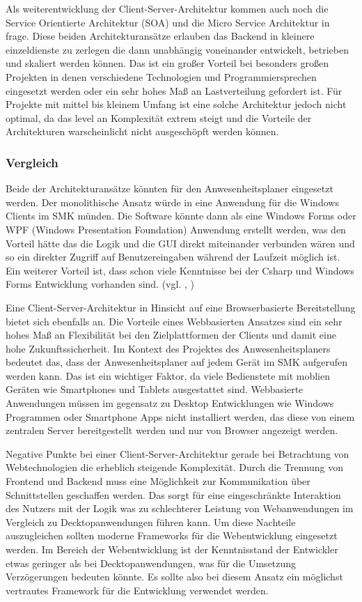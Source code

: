 Als weiterentwicklung der Client-Server-Architektur kommen auch noch die Service Orientierte Architektur (SOA) und die Micro Service Architektur in frage. Diese beiden Architekturansätze erlauben das Backend in kleinere einzeldienste zu zerlegen die dann unabhängig voneinander entwickelt, betrieben und skaliert werden können. Das ist ein großer Vorteil bei besonders großen Projekten in denen verschiedene Technologien und Programmiersprechen eingesetzt werden oder ein sehr hohes Maß an Lastverteilung gefordert ist. Für Projekte mit mittel bis kleinem Umfang ist eine solche Architektur jedoch nicht optimal, da das level an Komplexität extrem steigt und die Vorteile der Architekturen warscheinlicht nicht ausgeschöpft werden können.

\subsubsection{Vergleich}
\label{sec:Vergleich}
Beide der Architekturansätze könnten für den Anwesenheitsplaner eingesetzt werden. Der monolithische Ansatz würde in eine Anwendung für die Windows Clients im SMK münden. Die Software könnte dann als eine Windows Forms oder WPF (Windows Presentation Foundation) Anwendung erstellt werden, was den Vorteil hätte das die Logik und die GUI direkt miteinander verbunden wären und so ein direkter Zugriff auf Benutzereingaben während der Laufzeit möglich ist. Ein weiterer Vorteil ist, dass schon viele Kenntnisse bei der Csharp und Windows Forms Entwicklung vorhanden sind. (vgl. \cite{wpf}, \cite{modernApp})

Eine Client-Server-Architektur in Hinsicht auf eine Browserbasierte Bereitstellung bietet sich ebenfalls an. Die Vorteile eines Webbasierten Ansatzes sind ein sehr hohes Maß an Flexibilität bei den Zielplattformen der Clients und damit eine hohe Zukunftssicherheit. Im Kontext des Projektes des Anwesenheitsplaners bedeutet das, dass der Anwesenheitsplaner auf jedem Gerät im SMK aufgerufen werden kann. Das ist ein wichtiger Faktor, da viele Bedienstete mit moblien Geräten wie Smartphones und Tablets ausgestattet sind. Webbasierte Anwendungen müssen im gegensatz zu Desktop Entwicklungen wie Windows Programmen oder Smartphone Apps nicht installiert werden, das diese von einem zentralen Server bereitgestellt werden und nur von Browser angezeigt werden.

Negative Punkte bei einer Client-Server-Architektur gerade bei Betrachtung von Webtechnologien die erheblich steigende Komplexität. Durch die Trennung von Frontend und Backend muss eine Möglichkeit zur Kommunikation über Schnittstellen geschaffen werden. Das sorgt für eine eingeschränkte Interaktion des Nutzers mit der Logik was zu schlechterer Leistung von Webanwendungen im Vergleich zu Decktopanwendungen führen kann. Um diese Nachteile auszugleichen sollten moderne Frameworks für die Webentwicklung eingesetzt werden. Im Bereich der Webentwicklung ist der Kenntnisstand der Entwickler etwas geringer als bei Decktopanwendungen, was für die Umsetzung Verzögerungen bedeuten könnte. Es sollte also bei diesem Ansatz ein möglichst vertrautes Framework für die Entwicklung verwendet werden.

